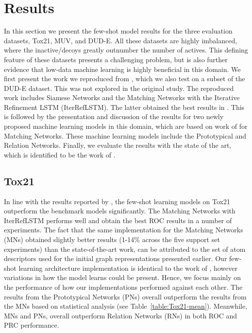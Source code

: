 \section{Results}

In this section we present the few-shot model results for the three evaluation datasets, Tox21, MUV, and DUD-E. All these datasets are highly imbalanced, where the inactive/decoys greatly outnumber the number of actives. This defining feature of these datasets presents a challenging problem, but is also further evidence that low-data machine learning is highly beneficial in this domain. We first present the work we reproduced from \citet{altae2017low}, which we also test on a subset of the DUD-E dataset. This was not explored in the original study. The reproduced work includes Siamese Networks \citep{koch2015siamese} and the Matching Networks \citep{vinyals2016matching} with the Iterative Refinement LSTM (IterRefLSTM). The latter obtained the best results in \citet{altae2017low}. This is followed by the presentation and discussion of the results for two newly proposed machine learning models in this domain, which are based on work of \citet{vinyals2016matching} for Matching Networks. These machine learning models include the Prototypical \citep{snell2017prototypical} and Relation \citep{sung2018learning} Networks. Finally, we evaluate the results with the state of the art, which is identified to be the work of \citet{altae2017low}.


\subsection{Tox21}

In line with the results reported by \citet{altae2017low}, the few-shot learning models on Tox21 outperform the benchmark models significantly. The Matching Networks with IterRefLSTM performs well and obtain the best ROC results in a number of experiments. The fact that the same implementation for the Matching Networks (MNs) obtained slightly better results (1-14\% across the five support set experiments) than the state-of-the-art work, can be attributed to the set of atom descriptors used for the initial graph representations presented earlier. Our few-shot learning architecture implementation is identical to the work of \citet{altae2017low}, however variations in how the model learns could be present. Hence, we focus mainly on the performance of how our implementations performed against each other. The results from the Prototypical Networks (PNs) overall outperform the results from the MNs based on statistical analysis (see Table~\ref{table:Tox21-mean}). Meanwhile, MNs and PNs, overall outperform Relation Networks (RNs) in both ROC and PRC performance. 

